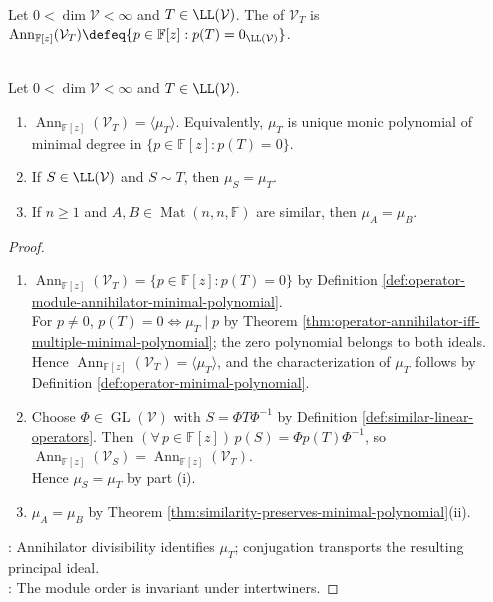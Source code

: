 \begin{definition} \label{def:operator-module-annihilator-minimal-polynomial} \\
Let $0<\dim\mathcal{V}<\infty$ and $T\in\LL(\mathcal{V})$. The  of $\mathcal{V}_T$ is $\operatorname{Ann}_{\mathbb{F}[z]}(\mathcal{V}_T)\defeq\{p\in\mathbb{F}[z]:p(T)=0_{\LL(\mathcal{V})}\}$.
\end{definition}

\begin{proposition} \label{prop:minimal-polynomial-module-order} \\
Let $0<\dim\mathcal{V}<\infty$ and $T\in\LL(\mathcal{V})$.
\begin{enumerate}[label=(\roman*)]
\setlength{\itemsep}{0pt}
\item $\operatorname{Ann}_{\mathbb{F}[z]}(\mathcal{V}_T)=\langle\mu_T\rangle$. Equivalently, $\mu_T$ is unique monic polynomial of minimal degree in $\{p\in\mathbb{F}[z]:p(T)=0\}$.
\item If $S\in\LL(\mathcal{V})$ and $S\sim T$, then $\mu_S=\mu_T$.
\item If $n\geq1$ and $A,B\in\operatorname{Mat}(n,n,\mathbb{F})$ are similar, then $\mu_A=\mu_B$.
\end{enumerate}
\begin{proof}
\begin{enumerate}[label=(\roman*)]
\setlength{\itemsep}{0pt}
\item $\operatorname{Ann}_{\mathbb{F}[z]}(\mathcal{V}_T)=\{p\in\mathbb{F}[z]:p(T)=0\}$ by Definition \ref{def:operator-module-annihilator-minimal-polynomial}.\\
For $p\neq0$, $p(T)=0\Longleftrightarrow\mu_T\mid p$ by Theorem \ref{thm:operator-annihilator-iff-multiple-minimal-polynomial}; the zero polynomial belongs to both ideals.\\
Hence $\operatorname{Ann}_{\mathbb{F}[z]}(\mathcal{V}_T)=\langle\mu_T\rangle$, and the characterization of $\mu_T$ follows by Definition \ref{def:operator-minimal-polynomial}.
\item Choose $\Phi\in\operatorname{GL}(\mathcal{V})$ with $S=\Phi T\Phi^{-1}$ by Definition \ref{def:similar-linear-operators}. Then $(\forall\,p\in\mathbb{F}[z])\,p(S)=\Phi p(T)\Phi^{-1}$, so $\operatorname{Ann}_{\mathbb{F}[z]}(\mathcal{V}_S)=\operatorname{Ann}_{\mathbb{F}[z]}(\mathcal{V}_T)$.\\
Hence $\mu_S=\mu_T$ by part (i).
\item $\mu_A=\mu_B$ by Theorem \ref{thm:similarity-preserves-minimal-polynomial}(ii).
\end{enumerate}
: Annihilator divisibility identifies $\mu_T$; conjugation transports the resulting principal ideal.\\
: The module order is invariant under intertwiners.
\end{proof}
\end{proposition}

